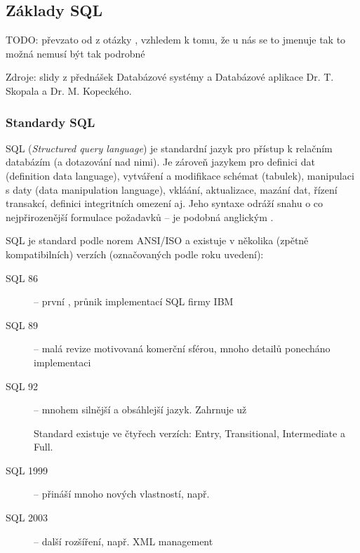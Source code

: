 \subsection{Základy SQL}
TODO: převzato od  z otázky , vzhledem k tomu, že u nás
se to jmenuje  tak to možná nemusí být tak podrobné

Zdroje: slidy z přednášek Databázové systémy a Databázové aplikace Dr. T. Skopala a Dr. M. Kopeckého.

\subsubsection*{Standardy SQL}

SQL (\emph{Structured query language}) je standardní jazyk pro přístup k relačním databázím (a dotazování nad nimi). Je zároveň jazykem pro definici dat (definition data language), vytváření a modifikace schémat (tabulek), manipulaci s daty (data manipulation language), vkláání, aktualizace, mazání dat, řízení transakcí, definici integritních omezení aj. Jeho syntaxe odráží snahu o co nejpřirozenější formulace požadavků -- je podobná anglickým .

SQL je standard podle norem ANSI/ISO a existuje v několika (zpětně kompatibilních) verzích (označovaných podle roku uvedení):
\begin{description}
    \item[SQL 86] -- první , průnik implementací SQL firmy IBM
    \item[SQL 89] -- malá revize motivovaná komerční sférou, mnoho detailů ponecháno implementaci
    \item[SQL 92] -- mnohem silnější a obsáhlejší jazyk. Zahrnuje už
    Standard existuje ve čtyřech verzích: Entry, Transitional, Intermediate a Full.
    \item[SQL 1999] -- přináší mnoho nových vlastností, např. 
    \item[SQL 2003] -- další rozšíření, např. XML management
\end{description}

